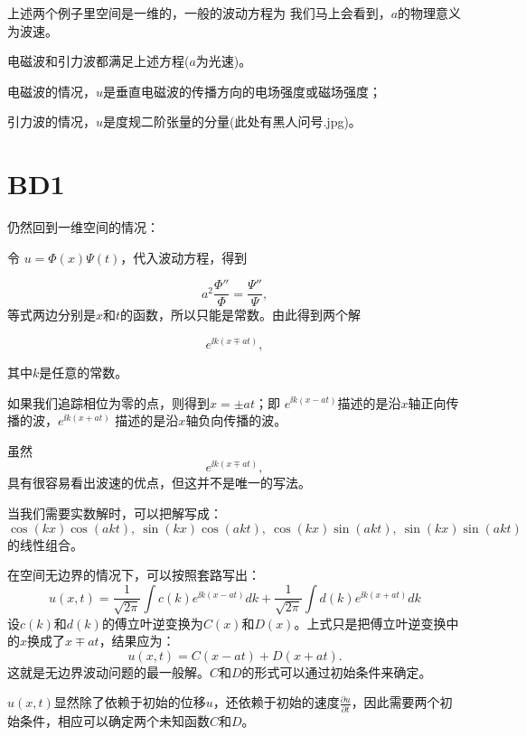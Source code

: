 \documentclass[CJK]{beamer}
\begin{document}
\begin{frame}
\bch
上述两个例子里空间是一维的，一般的波动方程为
我们马上会看到，$a$的物理意义为波速。

\skiplines


电磁波和引力波都满足上述方程($a$为光速)。

电磁波的情况，$u$是垂直电磁波的传播方向的电场强度或磁场强度；

引力波的情况，$u$是度规二阶张量的分量(此处有黑人问号.jpg)。

\ech
\end{frame}

\section{BD1}

\begin{frame}
\bch
仍然回到一维空间的情况：

令 $u = \Phi(x)\Psi(t)$，代入波动方程，得到

$$ a^2\frac{\Phi'' }{\Phi} =  \frac{\Psi''}{\Psi}, $$
等式两边分别是$x$和$t$的函数，所以只能是常数。由此得到两个解

$$ e^{\ii k(x\mp at)}, $$

其中$k$是任意的常数。

如果我们追踪相位为零的点，则得到$x = \pm at$；即 $e^{\ii k(x - at)}$描述的是沿$x$轴正向传播的波，$e^{\ii k(x + at)}$ 描述的是沿$x$轴负向传播的波。

\ech
\end{frame}


\begin{frame}
\bch
虽然
$$ e^{\ii k(x\mp at)}, $$
具有很容易看出波速的优点，但这并不是唯一的写法。

\skiplines


当我们需要实数解时，可以把解写成：
$$ \cos (kx)\cos(akt),\ \sin(kx)\cos(akt),\ \cos(kx)\sin(akt),\ \sin(kx)\sin(akt)$$
的线性组合。
\ech
\end{frame}


\begin{frame}
\bch
在空间无边界的情况下，可以按照套路写出：
$$ u(x,t) = \frac{1}{\sqrt{2\pi}} \int c(k)e^{\ii k(x-at)} dk + \frac{1}{\sqrt{2\pi}} \int d(k)e^{\ii k(x+at)} dk $$
设$c(k)$和$d(k)$的傅立叶逆变换为$C(x)$和$D(x)$。上式只是把傅立叶逆变换中的$x$换成了$x\mp at$，结果应为：
$$ u(x, t) = C(x-at) + D(x+at).$$
这就是无边界波动问题的最一般解。$C$和$D$的形式可以通过初始条件来确定。

{\scriptsize $u(x,t)$显然除了依赖于初始的位移$u$，还依赖于初始的速度$\frac{\partial u}{\partial t}$，因此需要两个初始条件，相应可以确定两个未知函数$C$和$D$。}

\ech
\end{frame}
\end{document}
